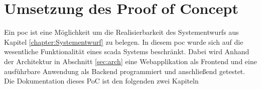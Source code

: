 \chapter{Umsetzung des Proof of Concept}
Ein \ac{poc} ist eine Möglichkeit um die Realisierbarkeit des Systementwurfs aus Kapitel \ref{chapter:Systementwurf} zu belegen.
In diesem  \ac{poc} wurde sich auf die wesentliche Funktionalität eines \ac{scada} Systems beschränkt.
Dabei wird Anhand der Architektur in Abschnitt \ref{sec:arch} eine Webapplikation als Frontend und eine ausführbare Anwendung als Backend programmiert und anschließend getestet.
Die Dokumentation dieses PoC ist den folgenden zwei Kapiteln %

